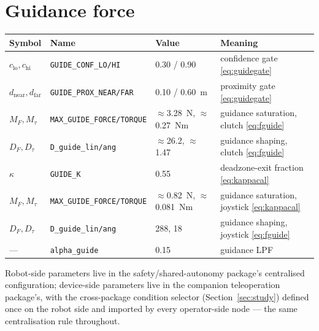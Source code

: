 \documentclass[12pt,a4paper,twoside,openright]{report}
\begin{document}
\section{Guidance force}
\begin{tabularx}{\linewidth}{@{}lllX@{}}
\toprule
Symbol & Name & Value & Meaning \\
\midrule
$c_{\text{lo}}, c_{\text{hi}}$ & \texttt{GUIDE\_CONF\_LO/HI} & 0.30 / 0.90 & confidence gate \eqref{eq:guidegate} \\
$d_{\text{near}}, d_{\text{far}}$ & \texttt{GUIDE\_PROX\_NEAR/FAR} & 0.10 / 0.60~m & proximity gate \eqref{eq:guidegate} \\
$M_F, M_\tau$ & \texttt{MAX\_GUIDE\_FORCE/TORQUE} & $\approx$3.28~N, $\approx$0.27~Nm & guidance saturation, clutch \eqref{eq:fguide} \\
$D_F, D_\tau$ & \texttt{D\_guide\_lin/ang} & $\approx$26.2, $\approx$1.47 & guidance shaping, clutch \eqref{eq:fguide} \\
$\kappa$ & \texttt{GUIDE\_K} & 0.55 & deadzone-exit fraction \eqref{eq:kappacal} \\
$M_F, M_\tau$ & \texttt{MAX\_GUIDE\_FORCE/TORQUE} & $\approx$0.82~N, $\approx$0.081~Nm & guidance saturation, joystick \eqref{eq:kappacal} \\
$D_F, D_\tau$ & \texttt{D\_guide\_lin/ang} & 288, 18 & guidance shaping, joystick \eqref{eq:fguide} \\
--- & \texttt{alpha\_guide} & 0.15 & guidance LPF \\
\bottomrule
\end{tabularx}

\endgroup

Robot-side parameters live in the safety/shared-autonomy package's centralised configuration; device-side parameters live in the companion teleoperation package's, with the cross-package condition selector (Section~\ref{sec:study}) defined once on the robot side and imported by every operator-side node --- the same centralisation rule throughout.



\end{document}
